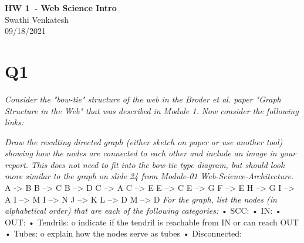 \documentclass[12pt]{article}
\begin{document}
\begin{centering}
{\large\textbf{HW 1\ - Web Science Intro}}\\ 
Swathi Venkatesh\\
09/18/2021\\
\end{centering}


\section*{Q1}

\emph{Consider the "bow-tie" structure of the web in the Broder et al. paper "Graph Structure in the Web" that was described in Module 1.
}
\emph{Now consider the following links:}


\emph{Draw the resulting directed graph (either sketch on paper or use another tool) showing how the nodes are connected to each other and include an image in your report. This does not need to fit into the bow-tie type diagram, but should look more similar to the graph on slide 24 from Module-01 Web-Science-Architecture.}
\newline
A -> B\newline
B --> C\newline
B --> D\newline
C --> A\newline
C --> E\newline
E --> C\newline
E --> G\newline
F --> E\newline
H --> G\newline
I --> A\newline
I --> M\newline
I --> N\newline
J --> K\newline
L --> D\newline
M --> D\newline
\newline
\emph{For the graph, list the nodes (in alphabetical order) that are each of the following categories:}
•	SCC:\newline
•	IN:\newline
•	OUT:\newline
•	Tendrils:\newline
      o	indicate if the tendril is reachable from IN or can reach OUT\newline
•	Tubes:\newline
      o	explain how the nodes serve as tubes\newline
•	Disconnected:
\end{document}
